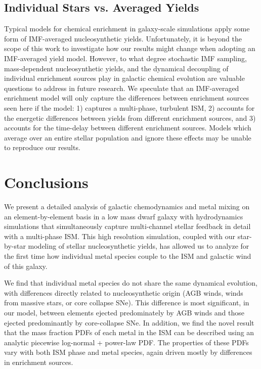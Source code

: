 \subsection{Individual Stars vs. Averaged Yields}
\label{ch3:sec:SSP yields}
Typical models for chemical enrichment in galaxy-scale simulations apply some form of IMF-averaged nucleosynthetic yields. Unfortunately, it is beyond the scope of this work to investigate how our results might change when adopting an IMF-averaged yield model. However, to what degree stochastic IMF sampling, mass-dependent nucleosynthetic yields, and the dynamical decoupling of individual enrichment sources play in galactic chemical evolution are valuable questions to address in future research. We speculate that an IMF-averaged enrichment model will only capture the differences between enrichment sources seen here if the model: 1) captures a multi-phase, turbulent ISM, 2) accounts for the energetic differences between yields from different enrichment sources, and 3) accounts for the time-delay between different enrichment sources. Models which average over an entire stellar population and ignore these effects may be unable to reproduce our results.

\section{Conclusions}
\label{ch3:sec:conclusions}
We present a detailed analysis of galactic chemodynamics and metal mixing on an element-by-element basis in a low mass dwarf galaxy with hydrodynamics simulations that simultaneously capture multi-channel stellar feedback in detail with a multi-phase ISM. This high resolution simulation, coupled with our star-by-star modeling of stellar nucleosynthetic yields, has allowed us to analyze for the first time how individual metal species couple to the ISM and galactic wind of this galaxy.

We find that individual metal species do not share the same dynamical evolution, with differences directly related to nucleosynthetic origin (AGB winds, winds from massive stars, or core collapse SNe). This difference is most significant, in our model, between elements ejected predominately by AGB winds and those ejected predominantly by core-collapse SNe. In addition, we find the novel result that the mass fraction PDFs of each metal in the ISM can be described using an analytic piecewise log-normal + power-law PDF. The properties of these PDFs vary with both ISM phase and metal species, again driven mostly by differences in enrichment sources.

